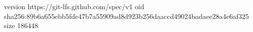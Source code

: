 version https://git-lfs.github.com/spec/v1
oid sha256:89b6a655ebb5fde47b7a55909ad8d923b256daaccd49024badaee28a4e6af325
size 186448
